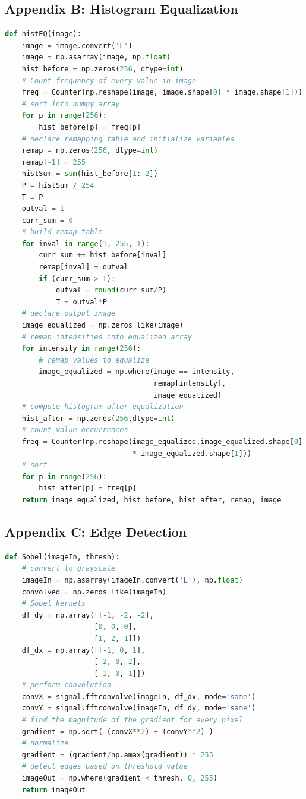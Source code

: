 \documentclass[11pt,a4paper]{article}
\begin{document}
\subsection{Appendix B: Histogram Equalization} \label{app:hist}
	\begin{lstlisting}[language=Python,label={lst:hist}]
def histEQ(image):
    image = image.convert('L')
    image = np.asarray(image, np.float)
    hist_before = np.zeros(256, dtype=int)
    # Count frequency of every value in image
    freq = Counter(np.reshape(image, image.shape[0] * image.shape[1]))
    # sort into numpy array
    for p in range(256):
        hist_before[p] = freq[p]
    # declare remapping table and initialize variables
    remap = np.zeros(256, dtype=int)
    remap[-1] = 255
    histSum = sum(hist_before[1:-2])
    P = histSum / 254
    T = P
    outval = 1
    curr_sum = 0
    # build remap table
    for inval in range(1, 255, 1):
        curr_sum += hist_before[inval]
        remap[inval] = outval
        if (curr_sum > T):
            outval = round(curr_sum/P)
            T = outval*P
    # declare output image
    image_equalized = np.zeros_like(image)
    # remap intensities into equalized array
    for intensity in range(256):
        # remap values to equalize
        image_equalized = np.where(image == intensity, 
                                   remap[intensity], 
                                   image_equalized)
    # compute histogram after equalization
    hist_after = np.zeros(256,dtype=int)
    # count value occurrences
    freq = Counter(np.reshape(image_equalized,image_equalized.shape[0] 
                              * image_equalized.shape[1]))
    # sort
    for p in range(256):
        hist_after[p] = freq[p]
    return image_equalized, hist_before, hist_after, remap, image
    \end{lstlisting}
    
\pagebreak
    
\subsection{Appendix C: Edge Detection} \label{app:edge}
    \begin{lstlisting}[language=Python,label={lst:edge}]
def Sobel(imageIn, thresh):
    # convert to grayscale
    imageIn = np.asarray(imageIn.convert('L'), np.float)
    convolved = np.zeros_like(imageIn)
    # Sobel kernels
    df_dy = np.array([[-1, -2, -2],
                     [0, 0, 0],
                     [1, 2, 1]])
    df_dx = np.array([[-1, 0, 1],
                     [-2, 0, 2],
                     [-1, 0, 1]])
    # perform convolution
    convX = signal.fftconvolve(imageIn, df_dx, mode='same')
    convY = signal.fftconvolve(imageIn, df_dy, mode='same')
    # find the magnitude of the gradient for every pixel
    gradient = np.sqrt( (convX**2) + (convY**2) )
    # normalize
    gradient = (gradient/np.amax(gradient)) * 255
    # detect edges based on threshold value
    imageOut = np.where(gradient < thresh, 0, 255)
    return imageOut
	\end{lstlisting}
	
\end{document}
